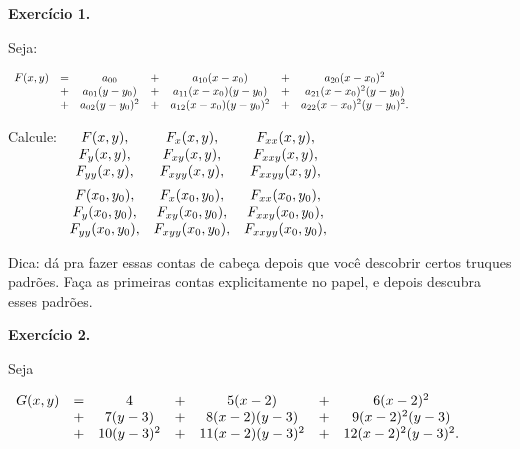 \documentclass[oneside,12pt]{article}
\begin{document}
\newpage


{\bf Exercício 1.}

Seja:

$\scalebox{0.8}{$
 \begin{array}[t]{cccccccc}
 F(x,y) &=& a_{00}           &+& a_{10} (x-x_0)           &+& a_{20} (x-x_0)^2         \\
        &+& a_{01} (y-y_0)   &+& a_{11} (x-x_0) (y-y_0)   &+& a_{21} (x-x_0)^2 (y-y_0) \\
        &+& a_{02} (y-y_0)^2 &+& a_{12} (x-x_0) (y-y_0)^2 &+& a_{22} (x-x_0)^2 (y-y_0)^2. \\
 \end{array}
 $}
$

\bsk

Calcule:
%
$\begin{array}[t]{cccccccc}
 F(x,y),      & F_x(x,y),     & F_{xx}(x,y), \\
 F_y(x,y),    & F_{xy}(x,y),  & F_{xxy}(x,y), \\
 F_{yy}(x,y), & F_{xyy}(x,y), & F_{xxyy}(x,y), \\[5pt]
 F(x_0,y_0),      & F_x(x_0,y_0),     & F_{xx}(x_0,y_0), \\
 F_y(x_0,y_0),    & F_{xy}(x_0,y_0),  & F_{xxy}(x_0,y_0), \\
 F_{yy}(x_0,y_0), & F_{xyy}(x_0,y_0), & F_{xxyy}(x_0,y_0), \\
 \end{array}
$

\bsk

Dica: dá pra fazer essas contas de cabeça depois que você descobrir
certos truques padrões. Faça as primeiras contas explicitamente no
papel, e depois descubra esses padrões.


\newpage

{\bf Exercício 2.}

Seja 

\msk

$\begin{array}[t]{cccccccc}
 G(x,y) &=& 4         &+& 5 (x-2)         &+& 6 (x-2)^2         \\
        &+& 7 (y-3)   &+& 8 (x-2) (y-3)   &+& 9 (x-2)^2 (y-3) \\
        &+& 10 (y-3)^2 &+& 11 (x-2) (y-3)^2 &+& 12 (x-2)^2 (y-3)^2. \\
 \end{array}
$
\end{document}
